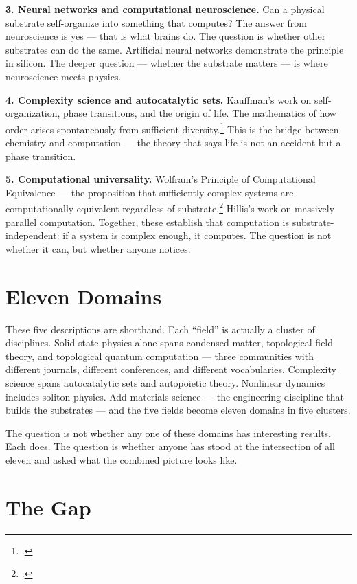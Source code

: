 \textbf{3. Neural networks and computational neuroscience.} Can a physical substrate self-organize into something that computes? The answer from neuroscience is yes --- that is what brains do. The question is whether other substrates can do the same. Artificial neural networks demonstrate the principle in silicon. The deeper question --- whether the substrate matters --- is where neuroscience meets physics.

\textbf{4. Complexity science and autocatalytic sets.} Kauffman's work on self-organization, phase transitions, and the origin of life. The mathematics of how order arises spontaneously from sufficient diversity.\footcite{kauffman1993} This is the bridge between chemistry and computation --- the theory that says life is not an accident but a phase transition.

\textbf{5. Computational universality.} Wolfram's Principle of Computational Equivalence --- the proposition that sufficiently complex systems are computationally equivalent regardless of substrate.\footcite{wolfram2002} Hillis's work on massively parallel computation. Together, these establish that computation is substrate-independent: if a system is complex enough, it computes. The question is not whether it can, but whether anyone notices.

\section*{Eleven Domains}
\label{spine:sg-eleven-domains}

These five descriptions are shorthand. Each ``field'' is actually a cluster of disciplines. Solid-state physics alone spans condensed matter, topological field theory, and topological quantum computation --- three communities with different journals, different conferences, and different vocabularies. Complexity science spans autocatalytic sets and autopoietic theory. Nonlinear dynamics includes soliton physics. Add materials science --- the engineering discipline that builds the substrates --- and the five fields become eleven domains in five clusters.

The question is not whether any one of these domains has interesting results. Each does. The question is whether anyone has stood at the intersection of all eleven and asked what the combined picture looks like.

\section*{The Gap}
\label{spine:sg-the-gap}

